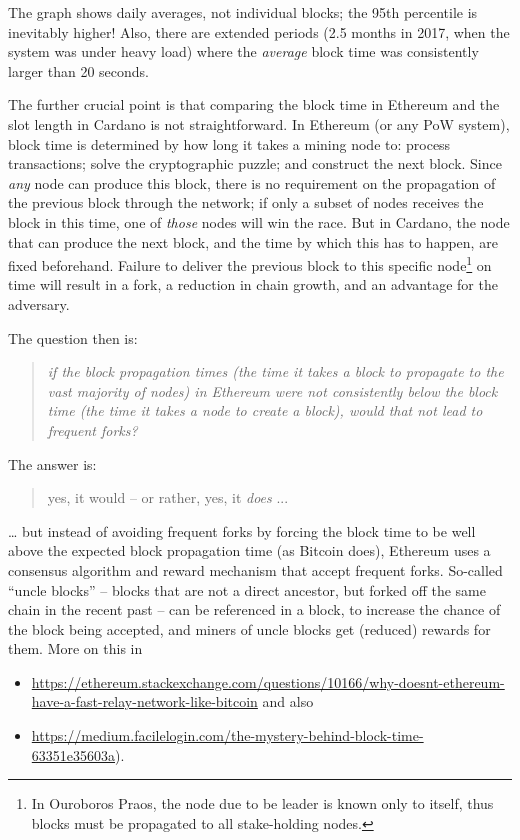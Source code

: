 \documentclass[11pt,a4paper]{article}
\begin{document}
The graph shows daily averages, not individual blocks; the 95th
percentile is inevitably higher! Also, there are extended periods (2.5
months in 2017, when the system was under heavy load) where the
\emph{average} block time was consistently larger than 20 seconds.

The further crucial point is that comparing the block time in Ethereum
and the slot length in Cardano is not straightforward. In Ethereum (or
any PoW system), block time is determined by how long it takes a mining
node to: process transactions; solve the cryptographic puzzle; and
construct the next block. Since \emph{any} node can produce this block,
there is no requirement on the propagation of the previous block through
the network; if only a subset of nodes receives the block in this time,
one of \emph{those} nodes will win the race. But in Cardano, the node
that can produce the next block, and the time by which this has to
happen, are fixed beforehand. Failure to deliver the previous block to
this specific node\footnote{In Ouroboros Praos, the node due to be
  leader is known only to itself, thus blocks must be propagated to all
  stake-holding nodes.} on time will result in a fork, a reduction in
chain growth, and an advantage for the adversary.

The question then is:

\begin{quote}
\emph{if the block propagation times (the time it takes a block to
propagate to the vast majority of nodes) in Ethereum were not
consistently below the block time (the time it takes a node to create a
block), would that not lead to frequent forks?}
\end{quote}

The answer is:

\begin{quote}
yes, it would -- or rather, yes, it \emph{does} ...
\end{quote}

\ldots{} but instead of avoiding frequent forks by forcing the block
time to be well above the expected block propagation time (as Bitcoin
does), Ethereum uses a consensus algorithm and reward mechanism that
accept frequent forks. So-called ``uncle blocks'' -- blocks that are not
a direct ancestor, but forked off the same chain in the recent past --
can be referenced in a block, to increase the chance of the block being
accepted, and miners of uncle blocks get (reduced) rewards for them.
More on this in

\begin{itemize}
\item
  \href{https://ethereum.stackexchange.com/questions/10166/why-doesnt-ethereum-have-a-fast-relay-network-like-bitcoin}{{https://ethereum.stackexchange.com/questions/10166/why-doesnt-ethereum-have-a-fast-relay-network-like-bitcoin}}
  and also
\item
  \href{https://medium.facilelogin.com/the-mystery-behind-block-time-63351e35603a}{{https://medium.facilelogin.com/the-mystery-behind-block-time-63351e35603a}}).
\end{itemize}
\end{document}
